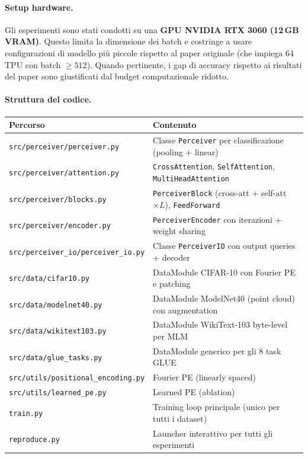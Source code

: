 \documentclass[
  11pt,
]{article}
\begin{document}
\paragraph{Setup hardware.} Gli esperimenti sono stati condotti su una \textbf{GPU NVIDIA RTX 3060 (12\,GB VRAM)}. Questo limita la dimensione dei batch e costringe a usare configurazioni di modello più piccole rispetto al paper originale (che impiega 64 TPU con batch $\geq 512$). Quando pertinente, i gap di accuracy rispetto ai risultati del paper sono giustificati dal budget computazionale ridotto.

\paragraph{Struttura del codice.}

\begin{center}
{\small
\begin{tabular}{@{}p{5cm}p{9cm}@{}}
\toprule
\textbf{Percorso} & \textbf{Contenuto} \\
\midrule
\texttt{src/perceiver/perceiver.py} & Classe \texttt{Perceiver} per classificazione (pooling + linear) \\
\texttt{src/perceiver/attention.py} & \texttt{CrossAttention}, \texttt{SelfAttention}, \texttt{MultiHeadAttention} \\
\texttt{src/perceiver/blocks.py} & \texttt{PerceiverBlock} (cross-att + self-att $\times L$), \texttt{FeedForward} \\
\texttt{src/perceiver/encoder.py} & \texttt{PerceiverEncoder} con iterazioni + weight sharing \\
\texttt{src/perceiver\_io/perceiver\_io.py} & Classe \texttt{PerceiverIO} con output queries + decoder \\
\texttt{src/data/cifar10.py} & DataModule CIFAR-10 con Fourier PE e patching \\
\texttt{src/data/modelnet40.py} & DataModule ModelNet40 (point cloud) con augmentation \\
\texttt{src/data/wikitext103.py} & DataModule WikiText-103 byte-level per MLM \\
\texttt{src/data/glue\_tasks.py} & DataModule generico per gli 8 task GLUE \\
\texttt{src/utils/positional\_encoding.py} & Fourier PE (linearly spaced) \\
\texttt{src/utils/learned\_pe.py} & Learned PE (ablation) \\
\texttt{train.py} & Training loop principale (unico per tutti i dataset) \\
\texttt{reproduce.py} & Launcher interattivo per tutti gli esperimenti \\
\bottomrule
\end{tabular}
}
\end{center}
\end{document}
